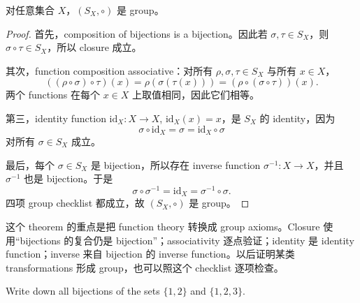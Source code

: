 \begin{theorem}[\(S_X\) is a group]
对任意集合 \(X\)，\((S_X,\circ)\) 是 group。
\end{theorem}

\begin{proof}
首先，composition of bijections is a bijection。因此若 \(\sigma,\tau\in S_X\)，则 \(\sigma\circ\tau\in S_X\)，所以 closure 成立。

其次，function composition associative：对所有 \(\rho,\sigma,\tau\in S_X\) 与所有 \(x\in X\)，
\[
  ((\rho\circ\sigma)\circ\tau)(x)
  =\rho(\sigma(\tau(x)))
  =(\rho\circ(\sigma\circ\tau))(x).
\]
两个 functions 在每个 \(x\in X\) 上取值相同，因此它们相等。

第三，identity function \(\mathrm{id}_X:X\to X\), \(\mathrm{id}_X(x)=x\)，是 \(S_X\) 的 identity，因为
\[
  \sigma\circ\mathrm{id}_X=\sigma=\mathrm{id}_X\circ\sigma
\]
对所有 \(\sigma\in S_X\) 成立。

最后，每个 \(\sigma\in S_X\) 是 bijection，所以存在 inverse function \(\sigma^{-1}:X\to X\)，并且 \(\sigma^{-1}\) 也是 bijection。于是
\[
  \sigma\circ\sigma^{-1}=\mathrm{id}_X
  =\sigma^{-1}\circ\sigma.
\]
四项 group checklist 都成立，故 \((S_X,\circ)\) 是 group。
\end{proof}

这个 theorem 的重点是把 function theory 转换成 group axioms。Closure 使用“bijections 的复合仍是 bijection”；associativity 逐点验证；identity 是 identity function；inverse 来自 bijection 的 inverse function。以后证明某类 transformations 形成 group，也可以照这个 checklist 逐项检查。

\begin{exerciseblock}
Write down all bijections of the sets \(\{1,2\}\) and \(\{1,2,3\}\).
\end{exerciseblock}

